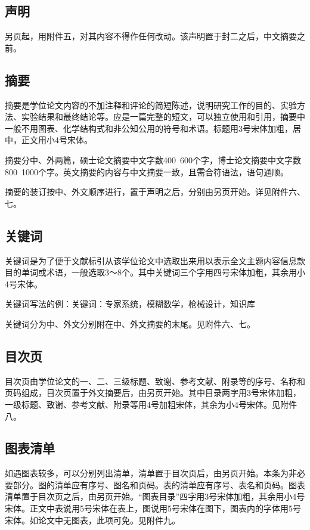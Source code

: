 \subsection{声明}
另页起，用附件五，对其内容不得作任何改动。该声明置于封二之后，中文摘要之前。

\subsection{摘要}
摘要是学位论文内容的不加注释和评论的简短陈述，说明研究工作的目的、实验方法、实验结果和最终结论等。应是一篇完整的短文，可以独立使用和引用，摘要中一般不用图表、化学结构式和非公知公用的符号和术语。标题用3号宋体加粗，居中，正文用小4号宋体。

摘要分中、外两篇，硕士论文摘要中文字数400~600个字，博士论文摘要中文字数800~1000个字。英文摘要的内容与中文摘要一致，且需合符语法，语句通顺。

摘要的装订按中、外文顺序进行，置于声明之后，分别由另页开始。详见附件六、七。

\subsection{关键词}
关键词是为了便于文献标引从该学位论文中选取出来用以表示全文主题内容信息款目的单词或术语，一般选取3～8个。其中关键词三个字用四号宋体加粗，其余用小4号宋体。

关键词写法的例：关键词：专家系统，模糊数学，枪械设计，知识库

关键词分为中、外文分别附在中、外文摘要的末尾。见附件六、七。

\subsection{目次页}
目次页由学位论文的一、二、三级标题、致谢、参考文献、附录等的序号、名称和页码组成，目次页置于外文摘要后，由另页开始。其中目录两字用3号宋体加粗，一级标题、致谢、参考文献、附录等用4号加粗宋体，其余为小4号宋体。见附件八。

\subsection{图表清单}
如遇图表较多，可以分别列出清单，清单置于目次页后，由另页开始。本条为非必要部分。图的清单应有序号、图名和页码。表的清单应有序号、表名和页码。图表清单置于目次页之后，由另页开始。“图表目录”四字用3号宋体加粗，其余用小4号宋体。正文中表说用5号宋体在表上，图说用5号宋体在图下，图表内的字体用5号宋体。如论文中无图表，此项可免。见附件九。

